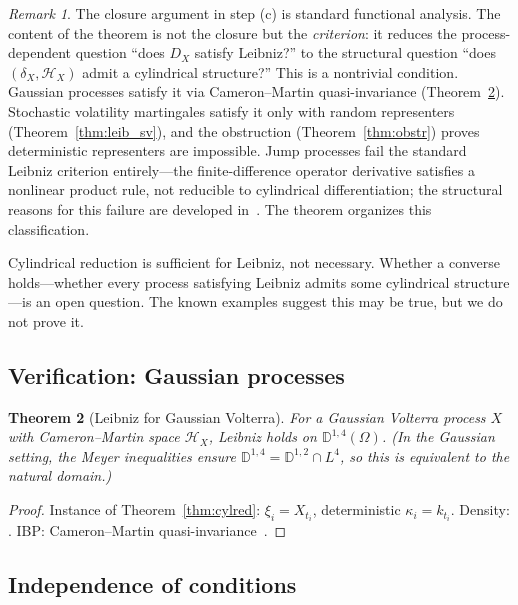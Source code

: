 \documentclass[11pt,a4paper]{article}
\theoremstyle{plain}
\newtheorem{theorem}{Theorem}[section]
\theoremstyle{definition}
\theoremstyle{remark}
\newtheorem{remark}[theorem]{Remark}
\newcommand{\HX}{\mathcal{H}_X}
\begin{document}
\begin{remark}\label{rem:cyl_meaning}
The closure argument in step (c) is standard functional analysis. The content of the theorem is not the closure but the \emph{criterion}: it reduces the process-dependent question ``does $D_X$ satisfy Leibniz?'' to the structural question ``does $(\delta_X, \HX)$ admit a cylindrical structure?'' This is a nontrivial condition. Gaussian processes satisfy it via Cameron--Martin quasi-invariance (Theorem~\ref{thm:leib_gauss}). Stochastic volatility martingales satisfy it only with random representers (Theorem~\ref{thm:leib_sv}), and the obstruction (Theorem~\ref{thm:obstr}) proves deterministic representers are impossible. Jump processes fail the standard Leibniz criterion entirely---the finite-difference operator derivative satisfies a nonlinear product rule, not reducible to cylindrical differentiation; the structural reasons for this failure are developed in~\cite{Fontes2026Banach}. The theorem organizes this classification.

Cylindrical reduction is sufficient for Leibniz, not necessary. Whether a converse holds---whether every process satisfying Leibniz admits some cylindrical structure---is an open question. The known examples suggest this may be true, but we do not prove it.
\end{remark}

\subsection{Verification: Gaussian processes}

\begin{theorem}[Leibniz for Gaussian Volterra]\label{thm:leib_gauss}
For a Gaussian Volterra process $X$ with Cameron--Martin space $\HX$, Leibniz holds on $\mathbb{D}^{1,4}(\Omega)$. (In the Gaussian setting, the Meyer inequalities ensure $\mathbb{D}^{1,4} = \mathbb{D}^{1,2}\cap L^4$, so this is equivalent to the natural domain.)
\end{theorem}

\begin{proof}
Instance of Theorem~\ref{thm:cylred}: $\xi_i = X_{t_i}$, deterministic $\kappa_i = k_{t_i}$. Density: \cite[Lemma 1.2.1]{Nualart2006}. IBP: Cameron--Martin quasi-invariance~\cite[Proposition 1.3.3]{Nualart2006}.
\end{proof}


\subsection{Independence of conditions}
\end{document}
